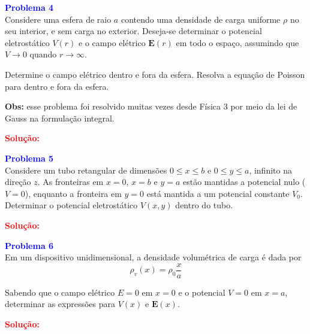 \documentclass[a4paper,12pt]{article}
\begin{document}
\begin{flushleft}
\textbf{\textcolor{blue}{\Large Problema 4}}\\

Considere uma esfera de raio \( a \) contendo uma densidade de carga uniforme \( \rho \) no 
seu interior, e sem carga no exterior. Deseja-se determinar o potencial eletrostático \( V(r) \) 
e o campo elétrico \( \mathbf{E}(r) \) em todo o espaço, assumindo que \( V \rightarrow 0 \) 
quando \( r \rightarrow \infty \). 

Determine o campo elétrico dentro e fora da esfera. Resolva a equação de Poisson para dentro 
e fora da esfera.

\textbf{Obs:} esse problema foi resolvido muitas vezes desde Física 3 por meio da lei 
de Gauss na formulação integral.

\textcolor{red}{\textbf{Solução:}}\\

\end{flushleft}

\begin{flushleft}
\textbf{\textcolor{blue}{\Large Problema 5}}\\

Considere um tubo retangular de dimensões \( 0 \leq x \leq b \) e \( 0 \leq y \leq a \), infinito na direção \( z \).  
As fronteiras em \( x = 0 \), \( x = b \) e \( y = a \) estão mantidas a potencial nulo (\( V = 0 \)), enquanto  
a fronteira em \( y = 0 \) está mantida a um potencial constante \( V_0 \).  
Determinar o potencial eletrostático \( V(x, y) \) dentro do tubo.

\textcolor{red}{\textbf{Solução:}}\\

\end{flushleft}

\begin{flushleft}
\textbf{\textcolor{blue}{\Large Problema 6}}\\

Em um dispositivo unidimensional, a densidade volumétrica de carga é dada por
\begin{equation}
\rho_v(x) = \rho_0 \frac{x}{a}
\end{equation}

\noindent
Sabendo que o campo elétrico \( E = 0 \) em \( x = 0 \) e o potencial \( V = 0 \) em \( x = a \), 
determinar as expressões para \( V(x) \) e \( \mathbf{E}(x) \).

\textcolor{red}{\textbf{Solução:}}\\

\end{flushleft}
\end{document}
